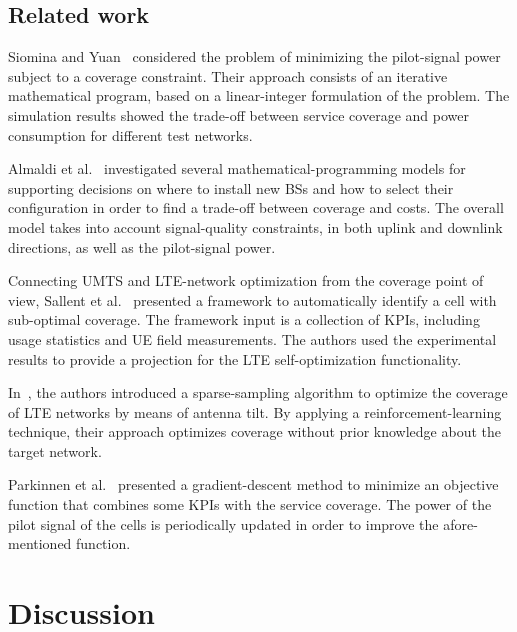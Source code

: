 \subsection*{Related work}

Siomina and Yuan~\cite{Siomina:Minimum.pilot.power.for.service.coverage}
considered the problem of minimizing the pilot-signal power subject
to a coverage constraint. Their approach consists of an iterative
mathematical program, based on a linear-integer formulation of the
problem. The simulation results showed the trade-off between service
coverage and power consumption for different test networks.

Almaldi et al.~\cite{Amaldi-Radio_planning_and_coverage_optimization_of_3G_networks:2008}
investigated several mathematical-programming models for supporting
decisions on where to install new BSs and how to select their configuration
in order to find a trade-off between coverage and costs. The overall
model takes into account signal-quality constraints, in both uplink
and downlink directions, as well as the pilot-signal power.

Connecting UMTS and LTE-network optimization from the coverage point
of view, Sallent et al.~\cite{Sallent-A_roadmap_from_UMTS_to_LTE_optimization:2011}
presented a framework to automatically identify a cell with sub-optimal
coverage. The framework input is a collection of KPIs, including usage
statistics and UE field measurements. The authors used the experimental
results to provide a projection for the LTE self-optimization functionality.

In~\cite{Thampi-A_sparse_sampling_algorithm_for_self_optimisation_of_coverage_in_LTE_networks:2012},
the authors introduced a sparse-sampling algorithm to optimize the
coverage of LTE networks by means of antenna tilt. By applying a reinforcement-learning
technique, their approach optimizes coverage without prior knowledge
about the target network.

Parkinnen et al.~\cite{Coverage.optimization.with.cost.function:2002}
presented a gradient-descent method to minimize an objective function
that combines some KPIs with the service coverage. The power of the
pilot signal of the cells is periodically updated in order to improve
the afore-mentioned function.


\section{Discussion}

